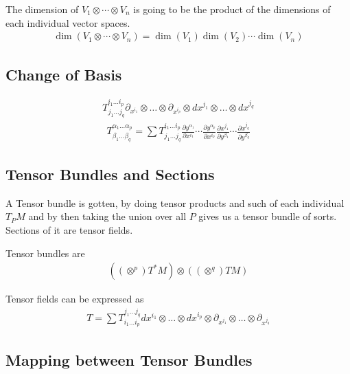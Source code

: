 \documentclass[10pt]{amsart}
\newcommand{\px}[1]{\partial_{x^{#1}}}
\renewcommand{\a}{\alpha}
\renewcommand{\b}{\beta}
\newcommand{\tvs}{V_1\ox\cdots\ox V_n}
\renewcommand{\*}{\star}
\newcommand{\ox}{\otimes}
\newcommand{\pder}[2]{\frac{\partial #1}{\partial #2}}
\begin{document}
The dimension of $\tvs$ is going to be the product of the dimensions of each
individual vector spaces.
\begin{align*}
  \dim(\tvs)=\dim(V_1)\dim(V_2)\cdots\dim(V_n)
\end{align*}

\subsection{Change of Basis}%
\label{sub:change_of_basis}

\begin{align*}
  T^{i_1\ldots i_p}_{j_1\ldots
  j_q}\px{i_1}\ox\ldots\ox\px{i_p}\ox dx^{j_1}\ox\ldots\ox dx^{j_q}
\end{align*}
\begin{align*}
  T^{\a_1\ldots \a_p}_{\b_1\ldots
  \b_q}=\sum
  T^{i_1\ldots i_p}_{j_1\ldots
  j_q}\pder{y^{\a_1}}{x^{i_1}}\cdots\pder{y^{\a_p}}{x^{i_p}}\pder{x^{j_1}}{y^{\b_1}}\cdots\pder{x^{j_q}}{y^{\b_q}}
\end{align*}

\subsection{Tensor Bundles and Sections}%
\label{sub:tensor_bundles_and_sections}

A Tensor bundle is gotten, by doing tensor products and such of each individual
$T_PM$ and by then taking the union over all $P$ gives us a tensor bundle of
sorts. Sections of it are tensor fields.

Tensor bundles are
\begin{align*}
  ((\ox^p)T^*M)\ox((\ox^q)TM)
\end{align*}

Tensor fields can be expressed as
\begin{align*}
  T=\sum T^{j_1\ldots j_q}_{i_1\ldots i_p}dx^{i_1}\ox\ldots\ox
  dx^{i_p}\ox\px{j_1}\ox\ldots\ox\px{j_q}
\end{align*}

\subsection{Mapping between Tensor Bundles}%
\label{sub:mapping_between_tensor_bundles}

\begin{center}
\end{center}
\end{document}
